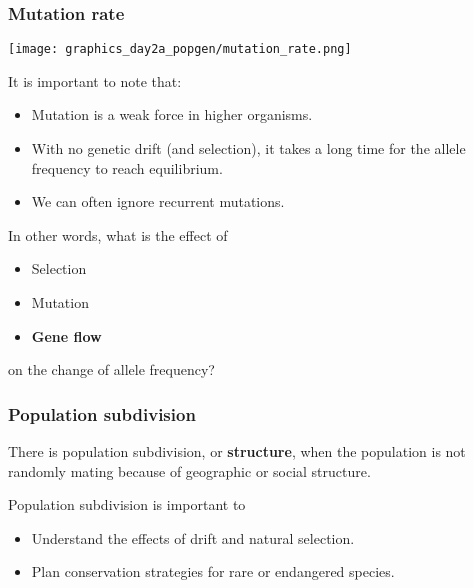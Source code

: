 \documentclass{beamer}
\newcommand{\1}{\ensuremath{\mathbf{1}}}
\begin{document}
%
%
%
\begin{frame}\frametitle{Mutation rate}
	\begin{center}
		\texttt{[image: graphics\_day2a\_popgen/mutation\_rate.png]}
	\end{center}
	It is important to note that:
	\begin{itemize}
		\item Mutation is a weak force in higher organisms.
		\item With no genetic drift (and selection), it takes a long time for the allele frequency to reach equilibrium.
		\item We can often ignore recurrent mutations.
	\end{itemize}
\end{frame}
%
%
%
\begin{frame}
	In other words, what is the effect of
	\begin{itemize}
		\item Selection
		\item Mutation
		\item \textbf{Gene flow}
	\end{itemize}
	on the change of allele frequency?
\end{frame}
%
%
%
\begin{frame}\frametitle{Population subdivision}
	\begin{block}{}
		There is population subdivision, or \textbf{structure}, when the population is not randomly mating because of geographic or social structure.
	\end{block}
	\vspace{1.5ex}
	Population subdivision is important to
	\begin{itemize}
		\item Understand the effects of drift and natural selection.
		\item Plan conservation strategies for rare or endangered species.
	\end{itemize}
\end{frame}
\end{document}
